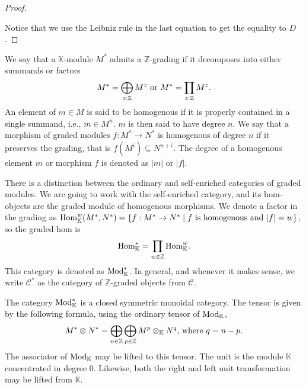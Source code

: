 \documentclass[../thesis.tex]{subfiles}
\begin{document}
\begin{proof}
\begin{center}
                \end{center}

                Notice that we use the Leibniz rule in the last equation to get the equality to $D$. 

            \end{proof}

            We say that a $\mathbb{K}$-module $M^*$ admits a $\mathbb{Z}$-grading if it decomposes into either summands or factors
            \begin{align*}
                M^* = \bigoplus_{z:\mathbb{Z}}M^z\tt{ or } M^* = \prod_{z:\mathbb{Z}}M^z\tt{.}
            \end{align*}
            An element of $m\in M$ is said to be homogenous if it is properly contained in a single summand, i.e., $m\in M^n$. $m$ is then said to have degree $n$. We say that a morphism of graded modules $f: M^*\rightarrow N^*$ is homogenous of degree $n$ if it preserves the grading, that is $f(M^i) \subseteq N^{n+i}$. The degree of a homogenous element $m$ or morphism $f$ is denoted as $|m|$ or $|f|$.
            
            There is a distinction between the ordinary and self-enriched categories of graded modules. We are going to work with the self-enriched category, and its hom-objects are the graded module of homogenous morphisms. We denote a factor in the grading as $\tt{Hom}_\mathbb{K}^w(M^*,N^*)=\startset{f : M^* \rightarrow N^* \mid f\tt{ is homogenous and }|f|=w}$, so the graded hom is
            \begin{align*}
                \tt{Hom}_\mathbb{K}^* = \prod_{w\in\mathbb{Z}}\tt{Hom}_\mathbb{K}^w\tt{.}
            \end{align*}
            This category is denoted as $\tt{Mod}_\mathbb{K}^*$. In general, and whenever it makes sense, we write $\mathcal{C}^*$ as the category of $\mathbb{Z}$-graded objects from $\mathcal{C}$.

            The category $\tt{Mod}_\mathbb{K}^*$ is a closed symmetric monoidal category. The tensor is given by the following formula, using the ordinary tensor of $\tt{Mod}_\mathbb{K}$,
            \begin{align*}
                M^*\otimes N^* = \bigoplus_{n\in \mathbb{Z}}\bigoplus_{p\in\mathbb{Z}}M^p\otimes_\mathbb{K} N^q\tt{, where }q = n - p\tt{.}
            \end{align*}
            The associator of $\tt{Mod}_\mathbb{K}$ may be lifted to this tensor. The unit is the module $\mathbb{K}$ concentrated in degree $0$. Likewise, both the right and left unit transformation may be lifted from $\mathbb{K}$. 
            
\end{document}
